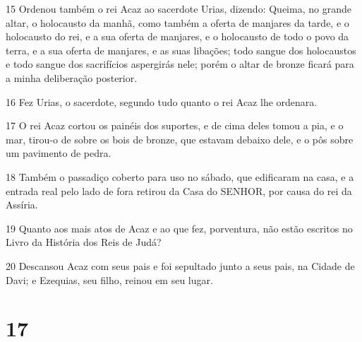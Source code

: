 \par 15 Ordenou também o rei Acaz ao sacerdote Urias, dizendo: Queima, no grande altar, o holocausto da manhã, como também a oferta de manjares da tarde, e o holocausto do rei, e a sua oferta de manjares, e o holocausto de todo o povo da terra, e a sua oferta de manjares, e as suas libações; todo sangue dos holocaustos e todo sangue dos sacrifícios aspergirás nele; porém o altar de bronze ficará para a minha deliberação posterior.
\par 16 Fez Urias, o sacerdote, segundo tudo quanto o rei Acaz lhe ordenara.
\par 17 O rei Acaz cortou os painéis dos suportes, e de cima deles tomou a pia, e o mar, tirou-o de sobre os bois de bronze, que estavam debaixo dele, e o pôs sobre um pavimento de pedra.
\par 18 Também o passadiço coberto para uso no sábado, que edificaram na casa, e a entrada real pelo lado de fora retirou da Casa do SENHOR, por causa do rei da Assíria.
\par 19 Quanto aos mais atos de Acaz e ao que fez, porventura, não estão escritos no Livro da História dos Reis de Judá?
\par 20 Descansou Acaz com seus pais e foi sepultado junto a seus pais, na Cidade de Davi; e Ezequias, seu filho, reinou em seu lugar.

\chapter{17}

